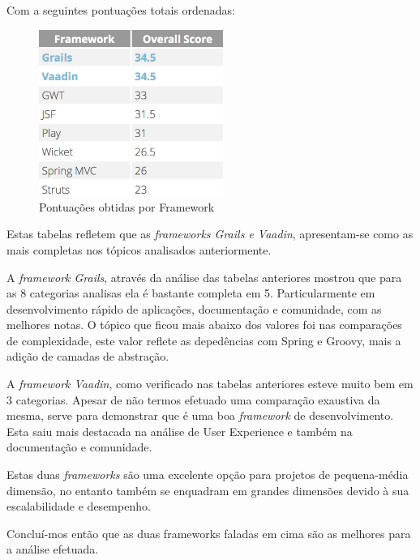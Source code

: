 Com a seguintes pontuações totais ordenadas:

\begin{figure}[ht!]
\centering
\includegraphics[width=60mm]{img/tot.png}
\caption{Pontuações obtidas por Framework}
\end{figure}


Estas tabelas refletem que as \textit{frameworks Grails e Vaadin}, apresentam-se como as mais completas nos tópicos analisados anteriormente.

A \textit{framework Grails}, através da análise das tabelas anteriores mostrou que para as 8 categorias analisas ela é bastante completa em 5. Particularmente em desenvolvimento rápido de aplicações, documentação e comunidade, com as melhores notas. O tópico que ficou mais abaixo dos valores foi nas comparações de complexidade, este valor reflete as depedências com Spring e Groovy, mais a adição de camadas de abstração.

A \textit{framework Vaadin}, como verificado nas tabelas anteriores esteve muito bem em 3 categorias. Apesar de não termos efetuado uma comparação exaustiva da mesma, serve para demonstrar que é uma boa \textit{framework} de desenvolvimento. Esta saiu mais destacada na análise de User Experience e também na documentação e comunidade.

Estas duas \textit{frameworks} são uma excelente opção para projetos de pequena-média dimensão, no entanto também se enquadram em grandes dimensões devido à sua escalabilidade e desempenho.

Concluí-mos então que as duas frameworks faladas em cima são as melhores para a análise efetuada.
